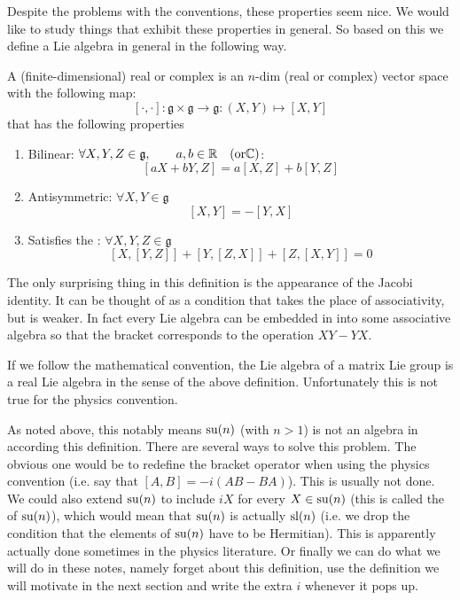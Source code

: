 Despite the problems with the conventions, these properties seem nice. We would like to study things that exhibit these properties in general. So based on this we define a Lie algebra in general in the following way.

\begin{definition}
A (finite-dimensional) real or complex  is an $n$-dim (real or complex) vector space with the following map:
\[[\cdot,\cdot]: \mathfrak{g}\times\mathfrak{g} \to \mathfrak{g}: (X,Y) \mapsto [X,Y]\]
that has the following properties
\begin{enumerate}
\item Bilinear: $\forall X,Y,Z \in \mathfrak{g}, \qquad a,b \in \mathbb{R} \quad (\text{or} \mathbb{C})$:
\[ [aX + bY, Z] = a[X,Z] + b[Y,Z] \]
\item Antisymmetric: $\forall X,Y \in \mathfrak{g}$
\[ [X,Y] = -[Y,X] \]
\item Satisfies the : $\forall X,Y,Z \in \mathfrak{g}$
\[ [X,[Y,Z]] + [Y,[Z,X]] + [Z,[X,Y]] = 0 \]
\end{enumerate}
\end{definition}
The only surprising thing in this definition is the appearance of the Jacobi identity. It can be thought of as a condition that takes the place of associativity, but is weaker. In fact every Lie algebra can be embedded in into some associative algebra so that the bracket corresponds to the operation $XY - YX$. 

If we follow the mathematical convention, the Lie algebra of a matrix Lie group is a real Lie algebra in the sense of the above definition. Unfortunately this is not true for the physics convention.

As noted above, this notably means $\operatorname{su}(n)$ (with $n>1$) is not an algebra in according this definition. There are several ways to solve this problem. The obvious one would be to redefine the bracket operator when using the physics convention (i.e. say that $[A,B] = -i \left(AB - BA\right)$). This is usually not done. We could also extend $\operatorname{su}(n)$ to include $iX$ for every $X \in \operatorname{su}(n)$ (this is called the  of $\operatorname{su}(n)$), which would mean that $\operatorname{su}(n)$ is actually $\operatorname{sl}(n)$ (i.e. we drop the condition that the elements of $\operatorname{su}(n)$ have to be Hermitian). This is apparently actually done sometimes in the physics literature. Or finally we can do what we will do in these notes, namely forget about this definition, use the definition we will motivate in the next section and write the extra $i$ whenever it pops up.

